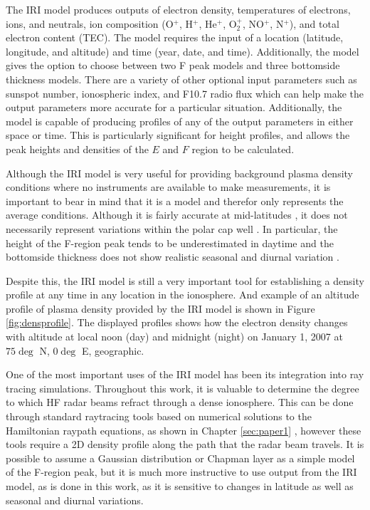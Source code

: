 The IRI model produces outputs of electron density, temperatures of electrons, ions, and neutrals, ion composition (O\(^+\), H\(^+\), He\(^+\), O\(_2^+\), NO\(^+\), N\(^+\)), and total electron content (TEC).  The model requires the input of a location (latitude, longitude, and altitude) and time (year, date, and time).  Additionally, the model gives the option to choose between two F peak models and three bottomside thickness models.  There are a variety of other optional input parameters such as sunspot number, ionospheric index, and F10.7 radio flux which can help make the output parameters more accurate for a particular situation.  Additionally, the model is capable of producing profiles of any of the output parameters in either space or time.  This is particularly significant for height profiles, and allows the peak heights and densities of the \(E\) and \(F\) region to be calculated.

Although the IRI model is very useful for providing background plasma density conditions where no instruments are available to make measurements, it is important to bear in mind that it is a model and therefor only represents the average conditions.  Although it is fairly accurate at mid-latitudes \citep{Coisson2006,Bilitza2012}, it does not necessarily represent variations within the polar cap well \citep{Themens2014,Makarevich2015b}.  In particular, the height of the F-region peak tends to be underestimated in daytime and the bottomside thickness does not show realistic seasonal and diurnal variation \citep{Themens2014}.  

Despite this, the IRI model is still a very important tool for establishing a density profile at any time in any location in the ionosphere.  And example of an altitude profile of plasma density provided by the IRI model is shown in Figure \ref{fig:densprofile}.  The displayed profiles shows how the electron density changes with altitude at local noon (day) and midnight (night) on January 1, 2007 at \(75\deg\) N, \(0\deg\) E, geographic.

One of the most important uses of the IRI model has been its integration into ray tracing simulations.  Throughout this work, it is valuable to determine the degree to which HF radar beams refract through a dense ionosphere.  This can be done through standard raytracing tools based on numerical solutions to the Hamiltonian raypath equations, as shown in Chapter \ref{sec:paper1} \citep{Haselgrove1963,Jones1975}, however these tools require a 2D density profile along the path that the radar beam travels.  It is possible to assume a Gaussian distribution or Chapman layer as a simple model of the F-region peak, but it is much more instructive to use output from the IRI model, as is done in this work, as it is sensitive to changes in latitude as well as seasonal and diurnal variations.

